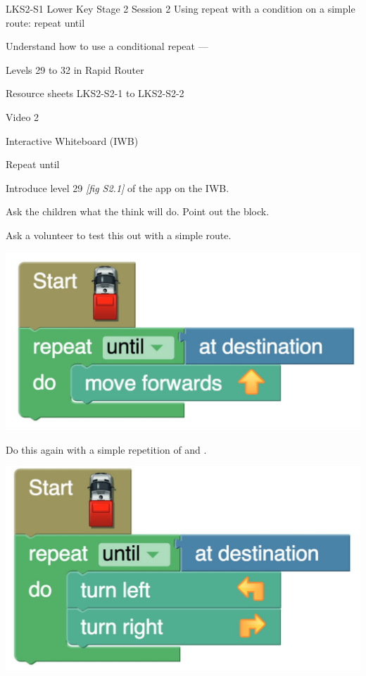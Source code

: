 \documentclass{../../../lessonplan}
\begin{document}
\lessonplantitle
    {LKS2-S1}
    {Lower Key Stage 2 Session 2}
    {Using repeat with a condition on a simple route: repeat until}

\preamble
    {
    \item Understand how to use a conditional repeat --- 
    }
    {
    \item Levels 29 to 32 in Rapid Router
    \item Resource sheets LKS2-S2-1 to LKS2-S2-2
    \item Video 2
    \item Interactive Whiteboard (IWB)
    }
    {
    \item Repeat until
    }

\begin{lessonplan}


Introduce level 29 \textit{[fig S2.1]} of the app on the IWB.

Ask the children what the think  will do.
Point out the  block.

Ask a volunteer to test this out with a simple route.

\includegraphics[width=\linewidth]{repeat_until1.jpg}

Do this again with a simple repetition of  and .

\includegraphics[width=\linewidth]{repeat_until2.jpg}


\end{lessonplan}
\end{document}
